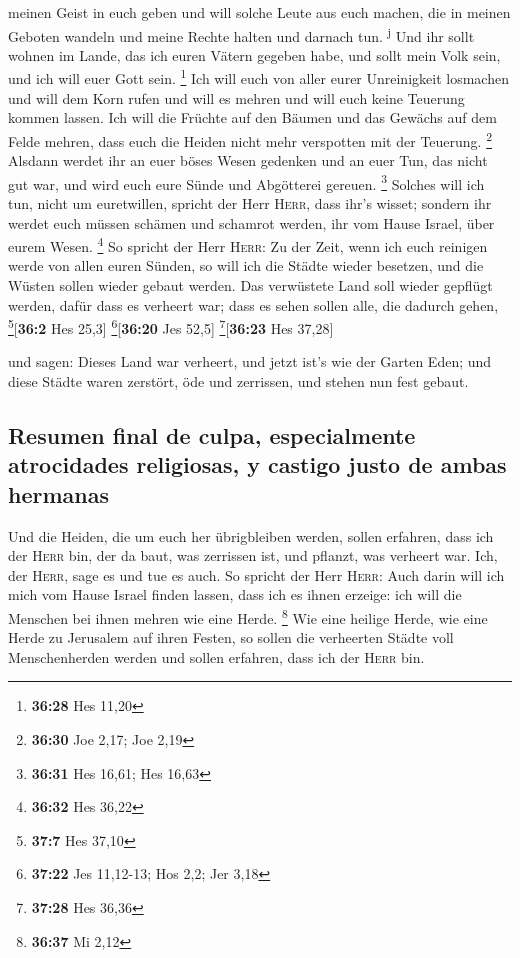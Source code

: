 meinen Geist in euch geben und will solche Leute aus euch machen, die in
meinen Geboten wandeln und meine Rechte halten und darnach tun.
\textsuperscript{j}  Und ihr sollt wohnen im Lande, das
ich euren Vätern gegeben habe, und sollt mein Volk sein, und ich will
euer Gott sein. \footnote{\textbf{36:28} Hes 11,20}  Ich
will euch von aller eurer Unreinigkeit losmachen und will dem Korn rufen
und will es mehren und will euch keine Teuerung kommen lassen.
 Ich will die Früchte auf den Bäumen und das Gewächs auf
dem Felde mehren, dass euch die Heiden nicht mehr verspotten mit der
Teuerung. \footnote{\textbf{36:30} Joe 2,17; Joe 2,19} 
Alsdann werdet ihr an euer böses Wesen gedenken und an euer Tun, das
nicht gut war, und wird euch eure Sünde und Abgötterei gereuen.
\footnote{\textbf{36:31} Hes 16,61; Hes 16,63}  Solches
will ich tun, nicht um euretwillen, spricht der Herr \textsc{Herr}, dass
ihr's wisset; sondern ihr werdet euch müssen schämen und schamrot
werden, ihr vom Hause Israel, über eurem Wesen. \footnote{\textbf{36:32}
  Hes 36,22}  So spricht der Herr \textsc{Herr}: Zu der
Zeit, wenn ich euch reinigen werde von allen euren Sünden, so will ich
die Städte wieder besetzen, und die Wüsten sollen wieder gebaut werden.
 Das verwüstete Land soll wieder gepflügt werden, dafür
dass es verheert war; dass es sehen sollen alle, die dadurch gehen,
\footnote{\textbf{37:7} Hes 37,10}{[}\textbf{36:2} Hes 25,3{]}
\footnote{\textbf{37:22} Jes 11,12-13; Hos 2,2; Jer 3,18}{[}\textbf{36:20}
Jes 52,5{]} \footnote{\textbf{37:28} Hes 36,36}{[}\textbf{36:23} Hes
37,28{]}

 und sagen: Dieses Land war verheert, und jetzt ist's wie
der Garten Eden; und diese Städte waren zerstört, öde und zerrissen, und
stehen nun fest gebaut.

\hypertarget{resumen-final-de-culpa-especialmente-atrocidades-religiosas-y-castigo-justo-de-ambas-hermanas}{%
\subsection{Resumen final de culpa, especialmente atrocidades
religiosas, y castigo justo de ambas
hermanas}\label{resumen-final-de-culpa-especialmente-atrocidades-religiosas-y-castigo-justo-de-ambas-hermanas}}

 Und die Heiden, die um euch her übrigbleiben werden,
sollen erfahren, dass ich der \textsc{Herr} bin, der da baut, was
zerrissen ist, und pflanzt, was verheert war. Ich, der \textsc{Herr},
sage es und tue es auch.  So spricht der Herr
\textsc{Herr}: Auch darin will ich mich vom Hause Israel finden lassen,
dass ich es ihnen erzeige: ich will die Menschen bei ihnen mehren wie
eine Herde. \footnote{\textbf{36:37} Mi 2,12}  Wie eine
heilige Herde, wie eine Herde zu Jerusalem auf ihren Festen, so sollen
die verheerten Städte voll Menschenherden werden und sollen erfahren,
dass ich der \textsc{Herr} bin.

